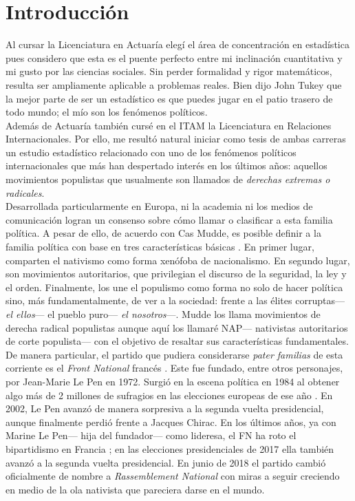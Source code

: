 \chapter*{Introducción}

Al cursar la Licenciatura en Actuaría elegí el área de concentración en estadística pues considero que esta es el puente perfecto entre mi inclinación cuantitativa y mi gusto por las ciencias sociales. Sin perder formalidad y rigor matemáticos, resulta ser ampliamente aplicable a problemas reales. Bien dijo John Tukey que la mejor parte de ser un estadístico es que puedes jugar en el patio trasero de todo mundo; el mío son los fenómenos políticos.\\

Además de Actuaría también cursé en el ITAM la Licenciatura en Relaciones Internacionales. Por ello, me resultó natural iniciar como tesis de ambas carreras un estudio estadístico relacionado con uno de los fenómenos políticos internacionales que más han despertado interés en los últimos años: aquellos movimientos populistas que usualmente son llamados de \textit{derechas extremas o radicales}.\\ 

Desarrollada particularmente en Europa, ni la academia ni los medios de comunicación logran un consenso sobre cómo llamar o clasificar a esta familia política. A pesar de ello, de acuerdo con Cas Mudde, es posible definir a la familia política con base en tres características básicas \parencites{Mudde07a}{Beauchamp16a}. En primer lugar, comparten el nativismo como forma xenófoba de nacionalismo. En segundo lugar, son movimientos autoritarios, que privilegian el discurso de la seguridad, la ley y el orden. Finalmente, los une el populismo como forma no solo de hacer política sino, más fundamentalmente, de ver a la sociedad: frente a las élites corruptas--- \textit{el ellos}--- el pueblo puro--- \textit{el nosotros}---. Mudde los llama movimientos de derecha radical populistas aunque aquí los llamaré NAP--- nativistas autoritarios de corte populista--- con el objetivo de resaltar sus características fundamentales.\\

De manera particular, el partido que pudiera considerarse \textit{pater familias} de esta corriente es el \textit{Front National} francés \parencite{Mudde07a}. Este fue fundado, entre otros personajes, por Jean-Marie Le Pen en 1972. Surgió en la escena política en 1984 al obtener algo más de 2 millones de sufragios en las elecciones europeas de ese año \parencite{LeBras15}. En 2002, Le Pen avanzó de manera sorpresiva a la segunda vuelta presidencial, aunque finalmente perdió frente a Jacques Chirac. En los últimos años, ya con Marine Le Pen--- hija del fundador--- como lideresa, el FN ha roto el bipartidismo en Francia \parencite{LeBras16};  en las elecciones presidenciales de 2017 ella también avanzó a la segunda vuelta presidencial. En junio de 2018 el partido cambió oficialmente de nombre a \textit{Rassemblement National} con miras a seguir creciendo en medio de la ola nativista que pareciera darse en el mundo.\\


